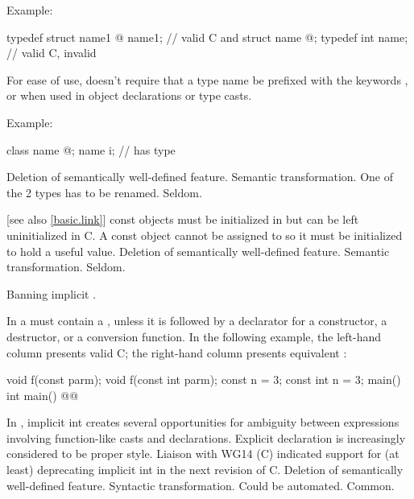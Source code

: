 Example:
\begin{codeblock}
typedef struct name1 { @\commentellip@ } name1;         // valid C and \Cpp{}
struct name { @\commentellip@ };
typedef int name;               // valid C, invalid \Cpp{}
\end{codeblock}

\rationale
For ease of use, \Cpp{} doesn't require that a type name be prefixed
with the keywords ,  or  when used in object
declarations or type casts.

Example:
\begin{codeblock}
class name { @\commentellip@ };
name i;                         //  has type 
\end{codeblock}

\effect
Deletion of semantically well-defined feature.
\difficulty
Semantic transformation.
One of the 2 types has to be renamed.
\howwide
Seldom.

 [see also \ref{basic.link}]
\change const objects must be initialized in \Cpp{} but can be left uninitialized in C.
\rationale
A const object cannot be assigned to so it must be initialized
to hold a useful value.
\effect
Deletion of semantically well-defined feature.
\difficulty
Semantic transformation.
\howwide
Seldom.

\change Banning implicit .

In \Cpp{} a
must contain a
, unless
it is followed by a declarator for a constructor, a destructor, or a
conversion function.
In the following example, the
left-hand column presents valid C;
the right-hand column presents
equivalent \Cpp{} :

\begin{codeblock}
void f(const parm);            void f(const int parm);
const n = 3;                   const int n = 3;
main()                         int main()
    @\commentellip@                      @\commentellip@
\end{codeblock}

\rationale
In \Cpp{}, implicit int creates several opportunities for
ambiguity between expressions involving function-like
casts and declarations.
Explicit declaration is increasingly considered
to be proper style.
Liaison with WG14 (C) indicated support for (at least)
deprecating implicit int in the next revision of C.
\effect
Deletion of semantically well-defined feature.
\difficulty
Syntactic transformation.
Could be automated.
\howwide
Common.

